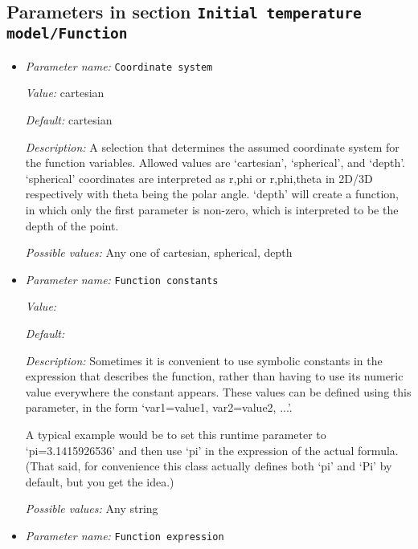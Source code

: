 \subsection{Parameters in section \tt Initial temperature model/Function}
\label{parameters:Initial_20temperature_20model/Function}

\begin{itemize}
\item {\it Parameter name:} {\tt Coordinate system}
\label{parameters:Initial temperature model/Function/Coordinate system}


{\it Value:} cartesian


{\it Default:} cartesian


{\it Description:} A selection that determines the assumed coordinate system for the function variables. Allowed values are `cartesian', `spherical', and `depth'. `spherical' coordinates are interpreted as r,phi or r,phi,theta in 2D/3D respectively with theta being the polar angle. `depth' will create a function, in which only the first parameter is non-zero, which is interpreted to be the depth of the point.


{\it Possible values:} Any one of cartesian, spherical, depth
\item {\it Parameter name:} {\tt Function constants}
\label{parameters:Initial temperature model/Function/Function constants}


{\it Value:} 


{\it Default:} 


{\it Description:} Sometimes it is convenient to use symbolic constants in the expression that describes the function, rather than having to use its numeric value everywhere the constant appears. These values can be defined using this parameter, in the form `var1=value1, var2=value2, ...'.

A typical example would be to set this runtime parameter to `pi=3.1415926536' and then use `pi' in the expression of the actual formula. (That said, for convenience this class actually defines both `pi' and `Pi' by default, but you get the idea.)


{\it Possible values:} Any string
\item {\it Parameter name:} {\tt Function expression}
\label{parameters:Initial temperature model/Function/Function expression}



\end{itemize}
